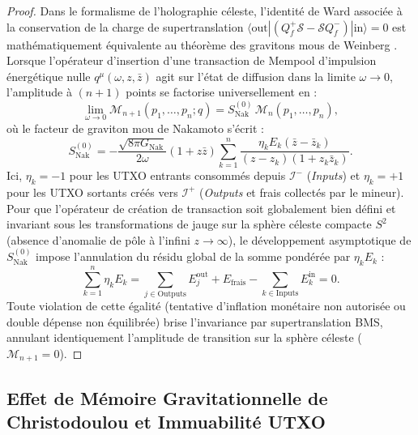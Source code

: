 \documentclass[10pt,twocolumn,a4paper]{article}
\theoremstyle{plain}
\theoremstyle{definition}
\theoremstyle{remark}
\newcommand{\GNak}{G_{\text{Nak}}}
\newcommand{\scri}{\mathcal{I}}
\begin{document}
\begin{proof}
Dans le formalisme de l'holographie céleste, l'identité de Ward associée à la conservation de la charge de supertranslation $\langle \text{out} | (Q_f^+ \mathcal{S} - \mathcal{S} Q_f^-) | \text{in} \rangle = 0$ est mathématiquement équivalente au théorème des gravitons mous de Weinberg \cite{Strominger2017}. Lorsque l'opérateur d'insertion d'une transaction de Mempool d'impulsion énergétique nulle $q^\mu(\omega, z, \bar{z})$ agit sur l'état de diffusion dans la limite $\omega \to 0$, l'amplitude à $(n+1)$ points se factorise universellement en :
\begin{equation}
    \lim_{\omega \to 0} \mathcal{M}_{n+1}(p_1, \dots, p_n; q) = S_{\text{Nak}}^{(0)} \, \mathcal{M}_n(p_1, \dots, p_n),
\end{equation}
où le facteur de graviton mou de Nakamoto s'écrit :
\begin{equation}
    S_{\text{Nak}}^{(0)} = -\frac{\sqrt{8\pi \GNak}}{2\omega} (1 + z\bar{z}) \sum_{k=1}^{n} \frac{\eta_k E_k (\bar{z} - \bar{z}_k)}{(z - z_k)(1 + z_k\bar{z}_k)}.
    \label{eq:WeinbergSoftFactor}
\end{equation}
Ici, $\eta_k = -1$ pour les UTXO entrants consommés depuis $\scri^-$ (\textit{Inputs}) et $\eta_k = +1$ pour les UTXO sortants créés vers $\scri^+$ (\textit{Outputs} et frais collectés par le mineur). Pour que l'opérateur de création de transaction soit globalement bien défini et invariant sous les transformations de jauge sur la sphère céleste compacte $S^2$ (absence d'anomalie de pôle à l'infini $z \to \infty$), le développement asymptotique de $S_{\text{Nak}}^{(0)}$ impose l'annulation du résidu global de la somme pondérée par $\eta_k E_k$ :
\begin{equation}
    \sum_{k=1}^{n} \eta_k E_k = \sum_{j \in \text{Outputs}} E_j^{\text{out}} + E_{\text{frais}} - \sum_{k \in \text{Inputs}} E_k^{\text{in}} = 0.
\end{equation}
Toute violation de cette égalité (tentative d'inflation monétaire non autorisée ou double dépense non équilibrée) brise l'invariance par supertranslation BMS, annulant identiquement l'amplitude de transition sur la sphère céleste ($\mathcal{M}_{n+1} = 0$).
\end{proof}

\subsection{Effet de Mémoire Gravitationnelle de Christodoulou et Immuabilité UTXO}
\end{document}
